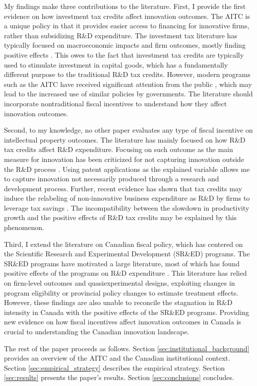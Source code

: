 \documentclass[../main.tex]{subfiles}
\begin{document}
My findings make three contributions to the literature. First, I provide the first evidence on how investment tax credits affect innovation outcomes. The AITC is a unique policy in that it provides easier access to financing for innovative firms, rather than subsidizing R\&D expenditure. The investment tax literature has typically focused on macroeconomic impacts and firm outcomes, mostly finding positive effects \parencite{pereira94, lyon89, slattery_zidar20}. This owes to the fact that investment tax credits are typically used to stimulate investment in capital goods, which has a fundamentally different purpose to the traditional R\&D tax credits. However, modern programs such as the AITC have received significant attention from the public \parencite{albertachamberofcommerce23,zabjeck16}, which may lead to the increased use of similar policies by governments. The literature should incorporate nontraditional fiscal incentives to understand how they affect innovation outcomes.

Second, to my knowledge, no other paper evaluates any type of fiscal incentive on intellectual property outcomes. The literature has mainly focused on how R\&D tax credits affect R\&D expenditure. Focusing on such outcome as the main measure for innovation has been criticized for not capturing innovation outside the R\&D process \parencite{xie_etal19}. Using patent applications as the explained variable allows me to capture innovation not necessarily produced through a research and development process. Further, recent evidence has shown that tax credits may induce the relabeling of non-innovative business expenditure as R\&D by firms to leverage tax savings \parencite{chen_etal21}. The incompatibility between the slowdown in productivity growth and the positive effects of R\&D tax credits may be explained by this phenomenon. 

Third, I extend the literature on Canadian fiscal policy, which has centered on the Scientific Research and Experimental Development (SR\&ED) programs. The SR\&ED programs have motivated a large literature, most of which has found positive effects of the programs on R\&D expenditure \parencite{agrawal_etal20,czarnitzki_etal11,berube_mohnen09,mansfield_switzer85a,bernstein86b}. This literature has relied on firm-level outcomes and quasiexperimental designs, exploiting changes in program eligibility or provincial policy changes to estimate treatment effects. However, these findings are also unable to reconcile the stagnation in R\&D intensity in Canada with the positive effects of the SR\&ED programs. Providing new evidence on how fiscal incentives affect innovation outcomes in Canada is crucial to understanding the Canadian innovation landscape. 

The rest of the paper proceeds as follows. Section \ref{sec:institutional_background} provides an overview of the AITC and the Canadian institutional context. Section \ref{sec:empirical_strategy} describes the empirical strategy. Section \ref{sec:results} presents the paper's results. Section \ref{sec:conclusions} concludes.
\end{document}
